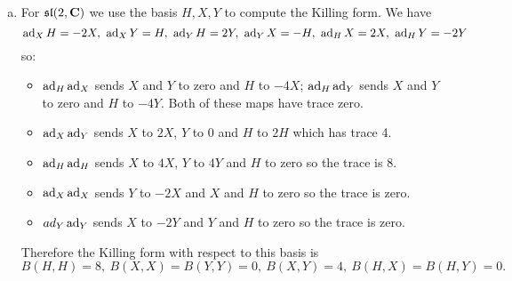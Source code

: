 \documentclass[12pt]{article}
\begin{document}
\begin{answer}
\begin{enumerate}[(a)]
\item For $\mathfrak{sl}(2,\mathbf{C})$ we use the basis $H,X,Y$ to compute the Killing form. We have
\[\ad_XH=-2X,\ \ad_XY=H,\ \ad_YH=2Y,\ \ad_YX=-H,\ \ad_HX=2X,\ \ad_HY=-2Y\]
so:
\begin{itemize}
\item $\operatorname{ad}_H\operatorname{ad}_X$ sends $X$ and $Y$ to zero and $H$ to $-4X$; $\operatorname{ad}_H\operatorname{ad}_Y$ sends $X$ and $Y$ to zero and $H$ to $-4Y$. Both of these maps have trace zero.
\item $\operatorname{ad}_X\operatorname{ad}_Y$ sends $X$ to $2X$, $Y$ to $0$ and $H$ to $2H$ which has trace 4.
\item $\operatorname{ad}_H\operatorname{ad}_H$ sends $X$ to $4X$, $Y$ to $4Y$ and $H$ to zero so the trace is 8.
\item $\operatorname{ad}_X\operatorname{ad}_X$ sends $Y$ to $-2X$ and $X$ and $H$ to zero so the trace is zero.
\item $ad_Y\operatorname{ad}_Y$ sends $X$ to $-2Y$ and $Y$ and $H$ to zero so the trace is zero.
\end{itemize}
Therefore the Killing form with respect to this basis is
\[B(H,H)=8,\ B(X,X)=B(Y,Y)=0,\ B(X,Y)=4,\ B(H,X)=B(H,Y)=0.\]
\end{enumerate}
\end{answer}
\fi
\end{document}
